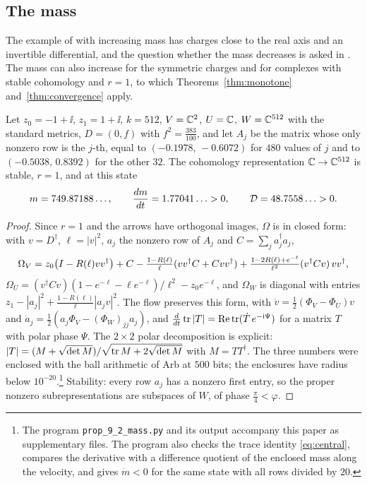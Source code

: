 \subsection{The mass}
The example of \cite[Theorem~1.1]{wue26} with increasing mass has charges
close to the real axis and an invertible differential, and the question
whether the mass decreases is asked in \cite[Question~5.18]{hkkp26}. The
mass can also increase for the symmetric charges and for complexes with
stable cohomology and $r=1$, to which Theorems~\ref{thm:monotone}
and~\ref{thm:convergence} apply.

\begin{proposition}\label{prop:mass}
Let $z_0=-1+\ii$, $z_1=1+\ii$, $k=512$, $V=\mathbb C^2$, $U=\mathbb C$, $W=\mathbb C^{512}$ with
the standard metrics, $D=(0,f)$ with $f^2=\frac{383}{100}$, and let $A_j$ be
the matrix whose only nonzero row is the $j$-th, equal to
$(-0.1978,\,-0.6072)$ for $480$ values of $j$ and to $(-0.5038,\,0.8392)$ for
the other $32$. The cohomology representation $\mathbb C\to\mathbb C^{512}$ is stable,
$r=1$, and at this state
\[
 m=749.87188\ldots,\qquad\frac{dm}{dt}=1.77041\ldots>0,\qquad\mathcal D=48.7558\ldots>0 .
\]
\end{proposition}

\begin{proof}
Since $r=1$ and the arrows have orthogonal images, $\Omega$ is in
closed form: with $v=D^\dagger$, $\ell=|v|^2$, $a_j$ the nonzero row of $A_j$
and $C=\sum_ja_j^\dagger a_j$,
\[
 \Omega_V=z_0\bigl(I-R(\ell)vv^\dagger\bigr)+C-\tfrac{1-R(\ell)}\ell(vv^\dagger C+Cvv^\dagger)
 +\tfrac{1-2R(\ell)+e^{-\ell}}{\ell^2}(v^\dagger Cv)\,vv^\dagger,
\]
$\Omega_U=(v^\dagger Cv)(1-e^{-\ell}-\ell e^{-\ell})/\ell^2-z_0e^{-\ell}$, and
$\Omega_W$ is diagonal with entries
$z_1-|a_j|^2+\frac{1-R(\ell)}\ell|a_jv|^2$. The flow preserves this form, with
$\dot v=\frac12(\Phi_V-\Phi_U)v$ and
$\dot a_j=\frac12(a_j\Phi_V-(\Phi_W)_{jj}a_j)$, and
$\frac d{dt}\operatorname{tr}|T|=\operatorname{Re}\operatorname{tr}(\dot T\,e^{-\mathrm i\Psi})$ for a matrix $T$ with polar
phase $\Psi$. The $2\times2$ polar decomposition is explicit:
$|T|=(M+\sqrt{\det M})/\sqrt{\operatorname{tr} M+2\sqrt{\det M}}$ with $M=TT^\dagger$. The
three numbers were enclosed with the ball arithmetic of Arb \cite{joh17} at $500$ bits; the
enclosures have radius below $10^{-20}$.\footnote{The program
\texttt{prop\_9\_2\_mass.py} and its output accompany this paper as
supplementary files. The program also checks
the trace identity \eqref{eq:central}, compares the derivative with a
difference quotient of the enclosed mass along the velocity, and gives
$\dot m<0$ for the same state with all rows divided by $20$.} Stability: every row $a_j$ has a nonzero
first entry, so the proper nonzero subrepresentations are subspaces of $W$,
of phase $\frac\pi4<\varphi$.
\end{proof}


